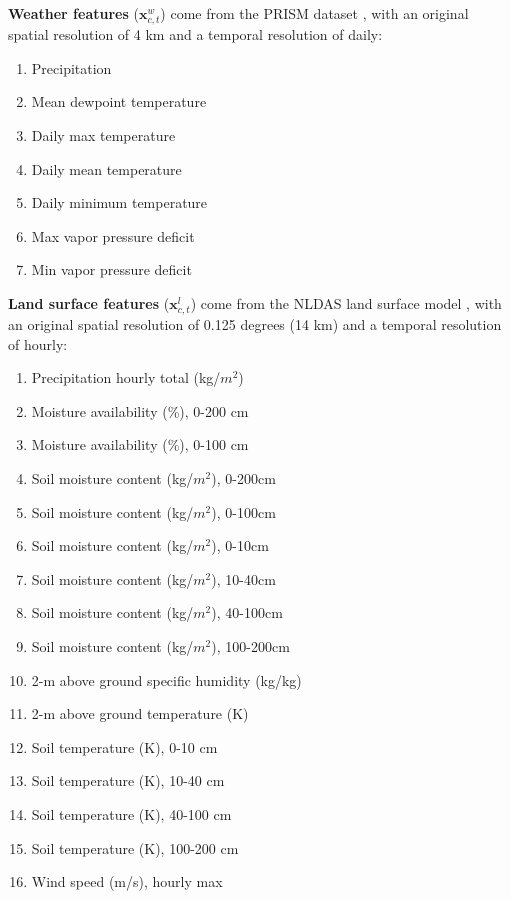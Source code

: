 \textbf{Weather features} ($\mathbf{x}_{c,t}^w$) come from the PRISM dataset \cite{daly2013prism}, with an original spatial resolution of 4 km and a temporal resolution of daily:

\begin{enumerate}
    \item Precipitation
    \item Mean dewpoint temperature
    \item Daily max temperature
    \item Daily mean temperature
    \item Daily minimum temperature
    \item Max vapor pressure deficit
    \item Min vapor pressure deficit
\end{enumerate}

\textbf{Land surface features} ($\mathbf{x}_{c,t}^l$) come from the NLDAS land surface model \cite{xia2012continental}, with an original spatial resolution of 0.125 degrees (14 km) and a temporal resolution of hourly:

\begin{enumerate}
    \item Precipitation hourly total (kg/$m^2$)
    \item Moisture availability (\%), 0-200 cm
    \item Moisture availability (\%), 0-100 cm
    \item Soil moisture content (kg/$m^2$), 0-200cm
    \item Soil moisture content (kg/$m^2$), 0-100cm
    \item Soil moisture content (kg/$m^2$), 0-10cm
    \item Soil moisture content (kg/$m^2$), 10-40cm
    \item Soil moisture content (kg/$m^2$), 40-100cm
    \item Soil moisture content (kg/$m^2$), 100-200cm
    \item 2-m above ground specific humidity (kg/kg)
    \item 2-m above ground temperature (K)
    \item Soil temperature (K), 0-10 cm
    \item Soil temperature (K), 10-40 cm
    \item Soil temperature (K), 40-100 cm
    \item Soil temperature (K), 100-200 cm
    \item Wind speed (m/s), hourly max
\end{enumerate}

